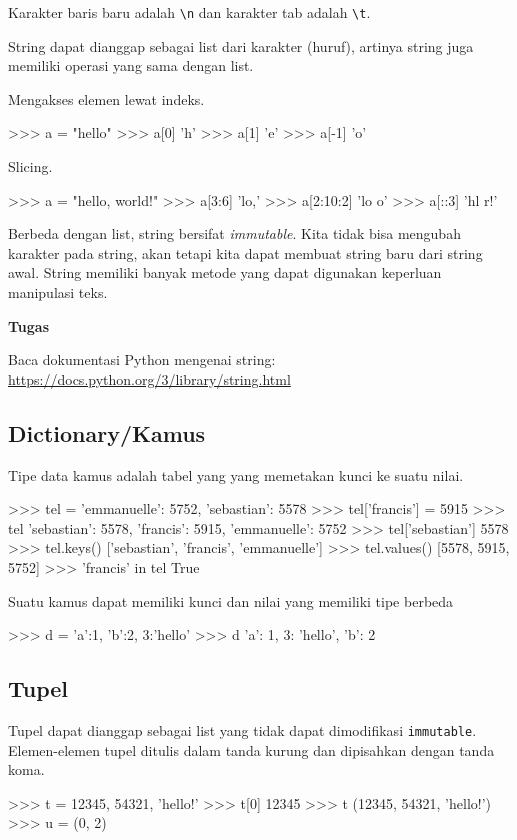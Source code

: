Karakter baris baru adalah \verb|\n| dan karakter tab adalah \verb|\t|.

String dapat dianggap sebagai list dari karakter (huruf), artinya string
juga memiliki operasi yang sama dengan list.

Mengakses elemen lewat indeks.
\begin{pyconcode}
>>> a = "hello"
>>> a[0]
'h'
>>> a[1]
'e'
>>> a[-1]
'o'
\end{pyconcode}

Slicing.
\begin{pyconcode}
>>> a = "hello, world!"
>>> a[3:6]
'lo,'
>>> a[2:10:2]
'lo o'
>>> a[::3]
'hl r!'
\end{pyconcode}

Berbeda dengan list, string bersifat \textit{immutable}.
Kita tidak bisa mengubah karakter pada string, akan tetapi kita dapat
membuat string baru dari string awal.
String memiliki banyak metode yang dapat digunakan keperluan
manipulasi teks.

\begin{mdframed}[backgroundcolor=myframebg]
\textbf{Tugas}

Baca dokumentasi Python mengenai string:
\url{https://docs.python.org/3/library/string.html}
\end{mdframed}


\subsection{Dictionary/Kamus}

Tipe data kamus adalah tabel yang yang memetakan kunci ke suatu nilai.
\begin{pyconcode}
>>> tel = {'emmanuelle': 5752, 'sebastian': 5578}
>>> tel['francis'] = 5915 
>>> tel
{'sebastian': 5578, 'francis': 5915, 'emmanuelle': 5752}
>>> tel['sebastian']
5578
>>> tel.keys()
['sebastian', 'francis', 'emmanuelle']
>>> tel.values()
[5578, 5915, 5752]
>>> 'francis' in tel
True
\end{pyconcode}

Suatu kamus dapat memiliki kunci dan nilai yang memiliki tipe berbeda
\begin{pyconcode}
>>> d = {'a':1, 'b':2, 3:'hello'}
>>> d
{'a': 1, 3: 'hello', 'b': 2}
\end{pyconcode}


\subsection{Tupel}

Tupel dapat dianggap sebagai list yang tidak dapat dimodifikasi \texttt{immutable}.
Elemen-elemen tupel ditulis dalam tanda kurung dan dipisahkan dengan
tanda koma.
\begin{pyconcode}
>>> t = 12345, 54321, 'hello!'
>>> t[0]
12345
>>> t
(12345, 54321, 'hello!')
>>> u = (0, 2)
\end{pyconcode}
